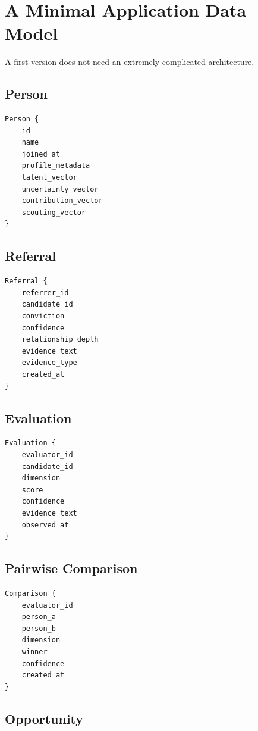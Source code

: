 \documentclass[11pt]{article}
\begin{document}
\section{A Minimal Application Data Model}

A first version does not need an extremely complicated architecture.

\subsection*{Person}

\begin{verbatim}
Person {
    id
    name
    joined_at
    profile_metadata
    talent_vector
    uncertainty_vector
    contribution_vector
    scouting_vector
}
\end{verbatim}

\subsection*{Referral}

\begin{verbatim}
Referral {
    referrer_id
    candidate_id
    conviction
    confidence
    relationship_depth
    evidence_text
    evidence_type
    created_at
}
\end{verbatim}

\subsection*{Evaluation}

\begin{verbatim}
Evaluation {
    evaluator_id
    candidate_id
    dimension
    score
    confidence
    evidence_text
    observed_at
}
\end{verbatim}

\subsection*{Pairwise Comparison}

\begin{verbatim}
Comparison {
    evaluator_id
    person_a
    person_b
    dimension
    winner
    confidence
    created_at
}
\end{verbatim}

\subsection*{Opportunity}
\end{document}
